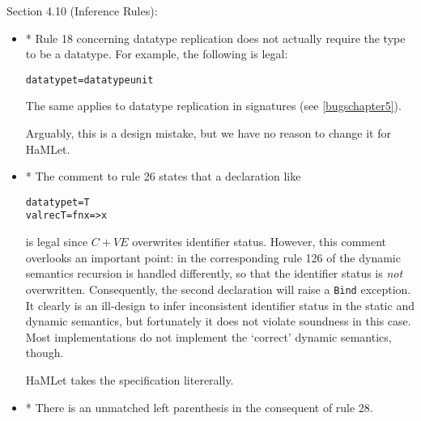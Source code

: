 \documentclass[twoside,titlepage]{article}
\newcommand{\void}[1]{}
\begin{document}
\begin{appendix}
\begin{itemize}
\end{itemize}


Section 4.10 (Inference Rules):

\begin{itemize}

\item * Rule 18 concerning datatype replication does not actually require the type to be a datatype. For example, the following is legal:

\begin{quoting}
\begin{alltt}
datatype t = datatype unit
\end{alltt}
\end{quoting}
The same applies to datatype replication in signatures (see \ref{bugschapter5}).

Arguably, this is a design mistake, but we have no reason to change it for HaMLet.

\item * The comment to rule 26 states that a declaration like

\begin{quoting}
\begin{alltt}
datatype t = T
val rec T = fn x => x
\end{alltt}
\end{quoting}

is legal since $C+\mathit{VE}$ overwrites identifier status. However, this comment overlooks an important point: in the corresponding rule 126 of the dynamic semantics recursion is handled differently, so that the identifier status is {\em not} overwritten. Consequently, the second declaration will raise a {\tt Bind} exception. It clearly is an ill-design to infer inconsistent identifier status in the static and dynamic semantics, but fortunately it does not violate soundness in this case. Most implementations do not implement the `correct' dynamic semantics, though.

HaMLet takes the specification litererally.

\item * There is an unmatched left parenthesis in the consequent of rule 28.

\void{
\item As an artefact of the treatment of type name generativity in the inference rules, the following expression is ill-typed according to the Definition \cite{mistakes}:

\begin{quoting}
\begin{alltt}
let
    val r = ref NONE
    datatype t = C
in
    r := SOME C
end
\end{alltt}
\end{quoting}

}
\end{itemize}
\end{appendix}
\end{document}
